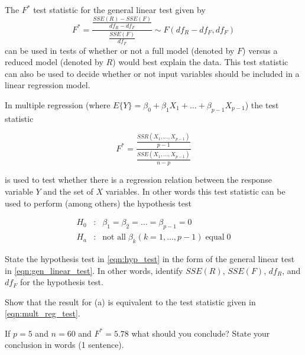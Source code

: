 \documentclass[12pt]{article}
\begin{document}
{
The $F^*$ test statistic for the general linear test given by
\begin{equation} F^* = \frac{\frac{SSE(R)-SSE(F)}{df_R-df_F}}{\frac{SSE(F)}{df_F}} \sim F(df_R-df_F, df_F) \label{eqn:gen_linear_test} \end{equation}
can be used in tests of whether or not a full model (denoted by $F$) versus a reduced model (denoted by $R$) would best explain the data.  This test statistic can also be used to decide whether or not input variables should be included in a linear regression model.

In multiple regression (where $E\{Y\} = \beta_0 + \beta_1 X_1 + \ldots + \beta_{p-1}X_{p-1}$) the test statistic

\begin{equation} F^* = \frac{\frac{SSR(X_1, \ldots, X_{p-1})}{p-1}}{\frac{SSE(X_1, \ldots, X_{p-1})}{n-p}}\label{eqn:mult_reg_test}\end{equation}

is used to test whether there is a regression relation between the response variable $Y$ and the set of $X$ variables.  In other words this test statistic can be used to perform (among others) the hypothesis test

\begin{eqnarray}
H_0 &:& \beta_1 = \beta_2 = \ldots = \beta_{p-1} = 0 \nonumber \\
H_a &:& \mbox{not all} \; \beta_k (k=1,\ldots,p-1) \; \mbox{equal} \; 0 \label{eqn:hyp_test}  
\end{eqnarray}

\abcs
\item State the hypothesis test in \eqref{eqn:hyp_test} in the form of the general linear test in \eqref{eqn:gen_linear_test}.   In other words, identify $SSE(R)$, $SSE(F)$, $df_R$, and $df_F$ for the hypothesis test. 
\item Show that  the result for (a) is equivalent to the test statistic given in \eqref{eqn:mult_reg_test}.  
\item If $p=5$ and $n=60$ and $F^* = 5.78$ what should you conclude?  State your conclusion in words (1 sentence).
\endabcs
}
{

\vfill

}
{
}



\problemsdone
\end{document}
